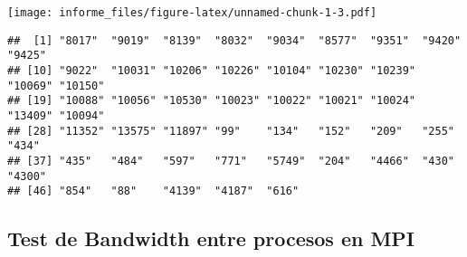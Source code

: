 \documentclass[
]{article}
\newenvironment{Shaded}{\begin{snugshade}}{\end{snugshade}}
\newcommand{\AttributeTok}[1]{\textcolor[rgb]{0.77,0.63,0.00}{#1}}
\newcommand{\CommentTok}[1]{\textcolor[rgb]{0.56,0.35,0.01}{\textit{#1}}}
\newcommand{\ConstantTok}[1]{\textcolor[rgb]{0.00,0.00,0.00}{#1}}
\newcommand{\DecValTok}[1]{\textcolor[rgb]{0.00,0.00,0.81}{#1}}
\newcommand{\FunctionTok}[1]{\textcolor[rgb]{0.00,0.00,0.00}{#1}}
\newcommand{\NormalTok}[1]{#1}
\newcommand{\OtherTok}[1]{\textcolor[rgb]{0.56,0.35,0.01}{#1}}
\newcommand{\SpecialCharTok}[1]{\textcolor[rgb]{0.00,0.00,0.00}{#1}}
\newcommand{\StringTok}[1]{\textcolor[rgb]{0.31,0.60,0.02}{#1}}
\begin{document}
\texttt{[image: informe\_files/figure-latex/unnamed-chunk-1-3.pdf]}

\begin{verbatim}
##  [1] "8017"  "9019"  "8139"  "8032"  "9034"  "8577"  "9351"  "9420"  "9425" 
## [10] "9022"  "10031" "10206" "10226" "10104" "10230" "10239" "10069" "10150"
## [19] "10088" "10056" "10530" "10023" "10022" "10021" "10024" "13409" "10094"
## [28] "11352" "13575" "11897" "99"    "134"   "152"   "209"   "255"   "434"  
## [37] "435"   "484"   "597"   "771"   "5749"  "204"   "4466"  "430"   "4300" 
## [46] "854"   "88"    "4139"  "4187"  "616"
\end{verbatim}

\hypertarget{test-de-bandwidth-entre-procesos-en-mpi}{%
\subsection{Test de Bandwidth entre procesos en
MPI}\label{test-de-bandwidth-entre-procesos-en-mpi}}

\begin{Shaded}
\end{Shaded}
\end{document}
